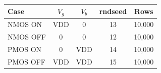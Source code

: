 \begin{tabular}{lcccc}
\toprule
Case & $V_g$ & $V_b$ & rndseed & Rows \\
\midrule
NMOS ON & VDD & 0 & 13 & 10,000 \\
NMOS OFF & 0 & 0 & 12 & 10,000 \\
PMOS ON & 0 & VDD & 14 & 10,000 \\
PMOS OFF & VDD & VDD & 15 & 10,000 \\
\bottomrule
\end{tabular}
